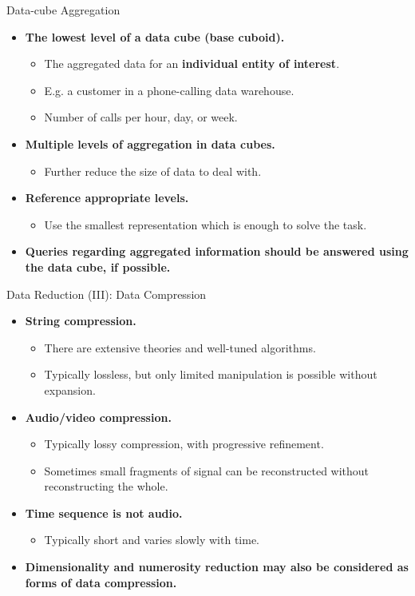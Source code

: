 \begin{frame}{Data-cube Aggregation}
	\begin{itemize}
		\item \textbf{The lowest level of a data cube (base cuboid).}
		      \begin{itemize}
			      \item The aggregated data for an \textbf{individual entity of
				            interest}.
			      \item E.g. a customer in a phone-calling data warehouse.
			      \item Number of calls per hour, day, or week.
		      \end{itemize}
		\item \textbf{Multiple levels of aggregation in data cubes.}
		      \begin{itemize}
			      \item Further reduce the size of data to deal with.
		      \end{itemize}
		\item \textbf{Reference appropriate levels.}
		      \begin{itemize}
			      \item Use the smallest representation which is enough to solve the
			            task.
		      \end{itemize}
		\item \textbf{Queries regarding aggregated information should be
			      answered using the data cube, if possible.}
	\end{itemize}
\end{frame}

\begin{frame}{Data Reduction (III): Data Compression}
	\begin{itemize}
		\item \textbf{String compression.}
		      \begin{itemize}
			      \item There are extensive theories and well-tuned algorithms.
			      \item Typically lossless, but only limited manipulation is possible
			            without expansion.
		      \end{itemize}
		\item \textbf{Audio/video compression.}
		      \begin{itemize}
			      \item Typically lossy compression, with progressive refinement.
			      \item Sometimes small fragments of signal can be reconstructed
			            without reconstructing the whole.
		      \end{itemize}
		\item \textbf{Time sequence is not audio.}
		      \begin{itemize}
			      \item Typically short and varies slowly with time.
		      \end{itemize}
		\item \textbf{Dimensionality and numerosity reduction may also be
			      considered as forms of data compression.}
	\end{itemize}
\end{frame}
